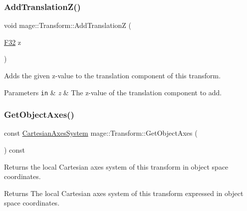 \subsubsection{\texorpdfstring{Add\+Translation\+Z()}{AddTranslationZ()}}
{\footnotesize\ttfamily void mage\+::\+Transform\+::\+Add\+TranslationZ (\begin{DoxyParamCaption}\item[{\hyperlink{namespacemage_aa97e833b45f06d60a0a9c4fc22ae02c0}{F32}}]{z }\end{DoxyParamCaption})\hspace{0.3cm}{\ttfamily [noexcept]}}

Adds the given z-\/value to the translation component of this transform.


\begin{DoxyParams}[1]{Parameters}
\mbox{\tt in}  & {\em z} & The z-\/value of the translation component to add. \\
\hline
\end{DoxyParams}
\hypertarget{structmage_1_1_transform_a71f590385c153fd0a9dd15af4b8a4bc7}{}\label{structmage_1_1_transform_a71f590385c153fd0a9dd15af4b8a4bc7} 
\subsubsection{\texorpdfstring{Get\+Object\+Axes()}{GetObjectAxes()}}
{\footnotesize\ttfamily const \hyperlink{structmage_1_1_cartesian_axes_system}{Cartesian\+Axes\+System} mage\+::\+Transform\+::\+Get\+Object\+Axes (\begin{DoxyParamCaption}{ }\end{DoxyParamCaption}) const\hspace{0.3cm}{\ttfamily [noexcept]}}

Returns the local Cartesian axes system of this transform in object space coordinates.

\begin{DoxyReturn}{Returns}
The local Cartesian axes system of this transform expressed in object space coordinates. 
\end{DoxyReturn}
\hypertarget{structmage_1_1_transform_a9f1bb95655238cd91ceae487d49ae6c2}{}\label{structmage_1_1_transform_a9f1bb95655238cd91ceae487d49ae6c2} 
